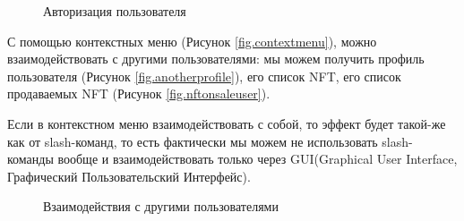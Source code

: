 \begin{figure}
    \centering
    \caption{Авторизация пользователя}
\end{figure}

С помощью контекстных меню (Рисунок {\color{blue} \ref{fig.contextmenu}}), можно взаимодействовать с другими пользователями: мы можем получить профиль пользователя (Рисунок {\color{blue} \ref{fig.anotherprofile}}), его список NFT, его список продаваемых NFT (Рисунок {\color{blue} \ref{fig.nftonsaleuser}}).

\begin{remark}
    Если в контекстном меню взаимодействовать с собой, то эффект будет такой-же как от slash-команд, то есть фактически мы можем не использовать slash-команды вообще и взаимодействовать только через GUI(Graphical User Interface, Графический Пользовательский Интерфейс).
\end{remark}

\begin{figure}
    \centering
    \caption{Взаимодействия с другими пользователями}
\end{figure}

